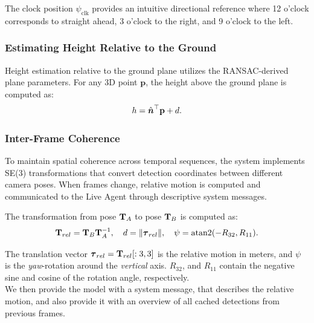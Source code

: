 The clock position \(\psi_{\text{clk}}\) provides an intuitive directional reference where 12 o'clock corresponds to straight ahead, 3 o'clock to the right, and 9 o'clock to the left.

\subsubsection{Estimating Height Relative to the Ground}
Height estimation relative to the ground plane utilizes the RANSAC-derived plane parameters. For any 3D point \(\mathbf{p}\), the height above the ground plane is computed as:
\begin{equation}
h = \hat{\boldsymbol{n}}^{\top} \mathbf{p} + d.
\label{eq:height}
\end{equation}

\subsubsection{Inter-Frame Coherence}




To maintain spatial coherence across temporal sequences, the system implements SE(3) transformations that convert detection coordinates between different camera poses. When frames change, relative motion is computed and communicated to the Live Agent through descriptive system messages.

The transformation from pose \(\mathbf{T}_A\) to pose \(\mathbf{T}_B\) is computed as:
\begin{equation}
\mathbf{T}_{rel} = \mathbf{T}_B \mathbf{T}_A^{-1},\quad
d = \|\boldsymbol{\tau}_{rel}\|,\quad
\psi = \operatorname{atan2}(-R_{32}, R_{11}).
\label{eq:relative_motion}
\end{equation}

The translation vector \(\boldsymbol{\tau}_{rel} = \mathbf{T}_{rel}[:3, 3]\) is the relative motion in meters, and \(\psi\) is the \emph{yaw}-rotation around the \emph{vertical} axis. \( R_{32} \), and \( R_{11} \) contain the negative sine and cosine of the rotation angle, respectively.\\
We then provide the model with a system message, that describes the relative motion, and also provide it with an overview of all cached detections from previous frames.


